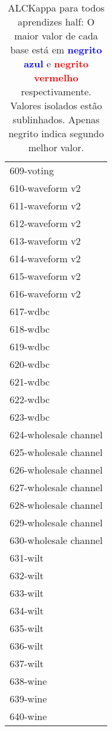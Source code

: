\begin{table}[h]
\caption{ALCKappa para todos aprendizes half: O maior valor de cada base está em \textcolor{blue}{\textbf{negrito azul}} e \textcolor{red}{\textbf{negrito vermelho}} respectivamente. Valores isolados estão sublinhados. Apenas negrito indica segundo melhor valor.}
\begin{center}\begin{tabular}{l}
 & \\ \hline 609-voting &  \\
610-waveform v2 &  \\
611-waveform v2 &  \\
612-waveform v2 &  \\
613-waveform v2 &  \\
614-waveform v2 &  \\
615-waveform v2 &  \\ \hline
616-waveform v2 &  \\
617-wdbc &  \\
618-wdbc &  \\
619-wdbc &  \\
620-wdbc &  \\
621-wdbc &  \\
622-wdbc &  \\ \hline
623-wdbc &  \\
624-wholesale channel &  \\
625-wholesale channel &  \\
626-wholesale channel &  \\
627-wholesale channel &  \\
628-wholesale channel &  \\
629-wholesale channel &  \\ \hline
630-wholesale channel &  \\
631-wilt &  \\
632-wilt &  \\
633-wilt &  \\
634-wilt &  \\
635-wilt &  \\
636-wilt &  \\ \hline
637-wilt &  \\
638-wine &  \\
639-wine &  \\
640-wine &  \\\end{tabular}\label{stratsALCKappa19AllReduxHalfb}
\end{center}
\end{table}
